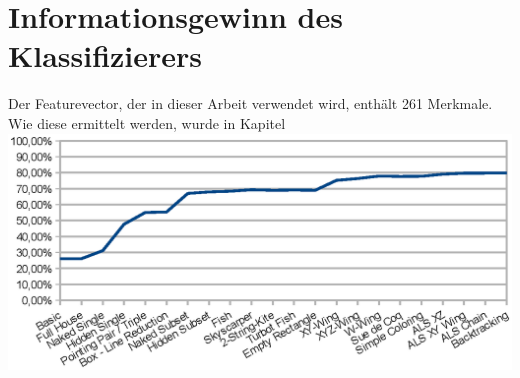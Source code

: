 \newpage
\section{Informationsgewinn des Klassifizierers}
Der Featurevector, der in dieser Arbeit verwendet wird, enthält 261 Merkmale. Wie diese ermittelt werden, wurde in Kapitel
\includegraphics{./img/accuracy.eps}